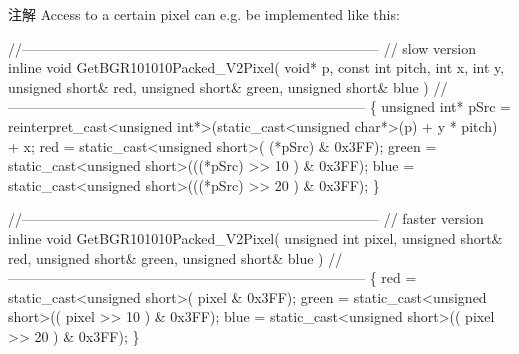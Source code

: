 \begin{Desc}
\begin{description}
\begin{DoxyNote}{注解}
Access to a certain pixel can e.\+g. be implemented like this\+:
\end{DoxyNote}

\begin{DoxyCode}
\textcolor{comment}{//-----------------------------------------------------------------------------}
\textcolor{comment}{// slow version}
\textcolor{keyword}{inline} \textcolor{keywordtype}{void} GetBGR101010Packed\_V2Pixel( \textcolor{keywordtype}{void}* p, \textcolor{keyword}{const} \textcolor{keywordtype}{int} pitch, \textcolor{keywordtype}{int} x, \textcolor{keywordtype}{int} y, \textcolor{keywordtype}{unsigned} \textcolor{keywordtype}{short}& red, \textcolor{keywordtype}{
      unsigned} \textcolor{keywordtype}{short}& green, \textcolor{keywordtype}{unsigned} \textcolor{keywordtype}{short}& blue )
\textcolor{comment}{//-----------------------------------------------------------------------------}
\{
  \textcolor{keywordtype}{unsigned} \textcolor{keywordtype}{int}* pSrc = \textcolor{keyword}{reinterpret\_cast<}\textcolor{keywordtype}{unsigned} \textcolor{keywordtype}{int}*\textcolor{keyword}{>}(\textcolor{keyword}{static\_cast<}\textcolor{keywordtype}{unsigned} \textcolor{keywordtype}{char}*\textcolor{keyword}{>}(p) + y * pitch) + x;
  red   = \textcolor{keyword}{static\_cast<}\textcolor{keywordtype}{unsigned} \textcolor{keywordtype}{short}\textcolor{keyword}{>}( (*pSrc)         & 0x3FF);
  green = \textcolor{keyword}{static\_cast<}\textcolor{keywordtype}{unsigned} \textcolor{keywordtype}{short}\textcolor{keyword}{>}(((*pSrc) >> 10 ) & 0x3FF);
  blue  = \textcolor{keyword}{static\_cast<}\textcolor{keywordtype}{unsigned} \textcolor{keywordtype}{short}\textcolor{keyword}{>}(((*pSrc) >> 20 ) & 0x3FF);
\}

\textcolor{comment}{//-----------------------------------------------------------------------------}
\textcolor{comment}{// faster version}
\textcolor{keyword}{inline} \textcolor{keywordtype}{void} GetBGR101010Packed\_V2Pixel( \textcolor{keywordtype}{unsigned} \textcolor{keywordtype}{int} pixel, \textcolor{keywordtype}{unsigned} \textcolor{keywordtype}{short}& red, \textcolor{keywordtype}{unsigned} \textcolor{keywordtype}{short}& green, \textcolor{keywordtype}{
      unsigned} \textcolor{keywordtype}{short}& blue )
\textcolor{comment}{//-----------------------------------------------------------------------------}
\{
  red   = \textcolor{keyword}{static\_cast<}\textcolor{keywordtype}{unsigned} \textcolor{keywordtype}{short}\textcolor{keyword}{>}(  pixel         & 0x3FF);
  green = \textcolor{keyword}{static\_cast<}\textcolor{keywordtype}{unsigned} \textcolor{keywordtype}{short}\textcolor{keyword}{>}(( pixel >> 10 ) & 0x3FF);
  blue  = \textcolor{keyword}{static\_cast<}\textcolor{keywordtype}{unsigned} \textcolor{keywordtype}{short}\textcolor{keyword}{>}(( pixel >> 20 ) & 0x3FF);
\}
\end{DoxyCode}



\end{description}
\end{Desc}

